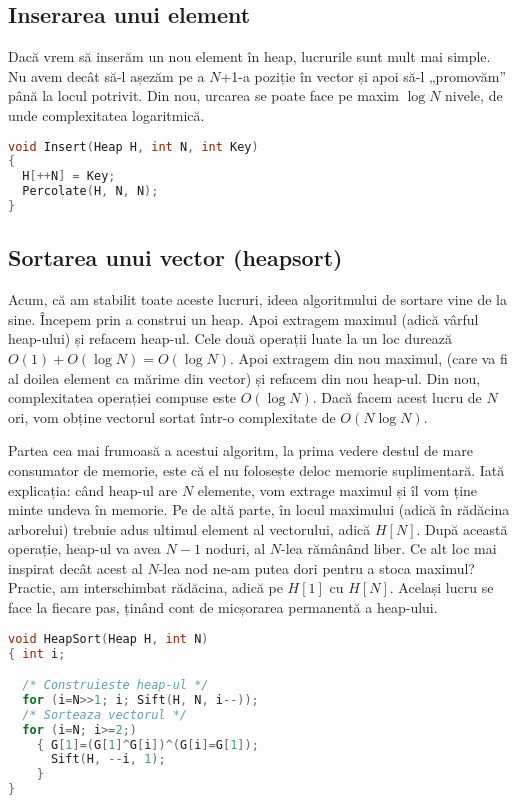 \subsection{Inserarea unui element}

Dacă vrem să inserăm un nou element în heap, lucrurile sunt mult mai
simple. Nu avem decât să-l așezăm pe a $N$+1-a poziție în vector și apoi să-l
„promovăm” până la locul potrivit. Din nou, urcarea se poate face pe maxim
$\log N$ nivele, de unde complexitatea logaritmică.

\begin{lstlisting}[language=C]
void Insert(Heap H, int N, int Key)
{
  H[++N] = Key;
  Percolate(H, N, N);
}
\end{lstlisting}

\subsection{Sortarea unui vector (heapsort)}

Acum, că am stabilit toate aceste lucruri, ideea algoritmului de sortare vine
de la sine. Începem prin a construi un heap. Apoi extragem maximul (adică
vârful heap-ului) și refacem heap-ul. Cele două operații luate la un loc
durează $O(1) + O(\log N) = O(\log N)$. Apoi extragem din nou maximul, (care
va fi al doilea element ca mărime din vector) și refacem din nou heap-ul. Din
nou, complexitatea operației compuse este $O(\log N)$. Dacă facem acest lucru
de $N$ ori, vom obține vectorul sortat într-o complexitate de $O(N \log N)$.

Partea cea mai frumoasă a acestui algoritm, la prima vedere destul de mare
consumator de memorie, este că el nu folosește deloc memorie
suplimentară. Iată explicația: când heap-ul are $N$ elemente, vom extrage
maximul și îl vom ține minte undeva în memorie. Pe de altă parte, în locul
maximului (adică în rădăcina arborelui) trebuie adus ultimul element al
vectorului, adică $H[N]$. După această operație, heap-ul va avea $N-1$ noduri,
al $N$-lea rămânând liber. Ce alt loc mai inspirat decât acest al $N$-lea nod
ne-am putea dori pentru a stoca maximul? Practic, am interschimbat rădăcina,
adică pe $H[1]$ cu $H[N]$. Același lucru se face la fiecare pas, ținând cont
de micșorarea permanentă a heap-ului.

\begin{lstlisting}[language=C]
void HeapSort(Heap H, int N)
{ int i;

  /* Construieste heap-ul */
  for (i=N>>1; i; Sift(H, N, i--));
  /* Sorteaza vectorul */
  for (i=N; i>=2;)
    { G[1]=(G[1]^G[i])^(G[i]=G[1]);
      Sift(H, --i, 1);
    }
}
\end{lstlisting}

